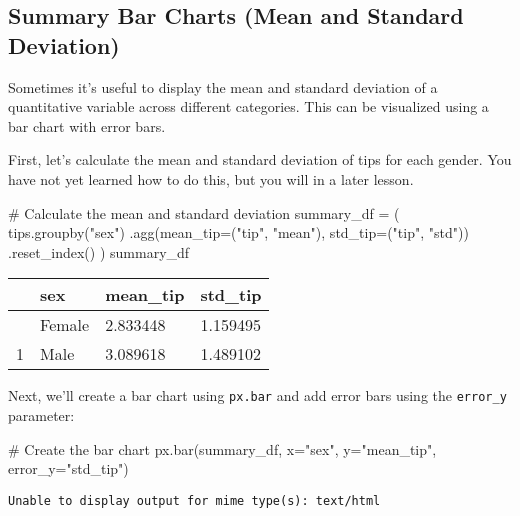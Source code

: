\documentclass[
  letterpaper,
  DIV=11,
  numbers=noendperiod]{scrreprt}
\newenvironment{Shaded}{\begin{snugshade}}{\end{snugshade}}
\newcommand{\CommentTok}[1]{\textcolor[rgb]{0.37,0.37,0.37}{#1}}
\newcommand{\NormalTok}[1]{\textcolor[rgb]{0.00,0.23,0.31}{#1}}
\newcommand{\OperatorTok}[1]{\textcolor[rgb]{0.37,0.37,0.37}{#1}}
\newcommand{\StringTok}[1]{\textcolor[rgb]{0.13,0.47,0.30}{#1}}
\begin{document}
\subsection{Summary Bar Charts (Mean and Standard
Deviation)}\label{summary-bar-charts-mean-and-standard-deviation}

Sometimes it's useful to display the mean and standard deviation of a
quantitative variable across different categories. This can be
visualized using a bar chart with error bars.

First, let's calculate the mean and standard deviation of tips for each
gender. You have not yet learned how to do this, but you will in a later
lesson.

\begin{Shaded}
\begin{Highlighting}[]
\CommentTok{\# Calculate the mean and standard deviation}
\NormalTok{summary\_df }\OperatorTok{=}\NormalTok{ (}
\NormalTok{    tips.groupby(}\StringTok{"sex"}\NormalTok{)}
\NormalTok{    .agg(mean\_tip}\OperatorTok{=}\NormalTok{(}\StringTok{"tip"}\NormalTok{, }\StringTok{"mean"}\NormalTok{), std\_tip}\OperatorTok{=}\NormalTok{(}\StringTok{"tip"}\NormalTok{, }\StringTok{"std"}\NormalTok{))}
\NormalTok{    .reset\_index()}
\NormalTok{)}
\NormalTok{summary\_df}
\end{Highlighting}
\end{Shaded}

\begin{longtable}[]{@{}llll@{}}
\toprule\noalign{}
& sex & mean\_tip & std\_tip \\
\midrule\noalign{}
\endhead
\bottomrule\noalign{}
\endlastfoot
0 & Female & 2.833448 & 1.159495 \\
1 & Male & 3.089618 & 1.489102 \\
\end{longtable}

Next, we'll create a bar chart using \texttt{px.bar} and add error bars
using the \texttt{error\_y} parameter:

\begin{Shaded}
\begin{Highlighting}[]
\CommentTok{\# Create the bar chart}
\NormalTok{px.bar(summary\_df, x}\OperatorTok{=}\StringTok{"sex"}\NormalTok{, y}\OperatorTok{=}\StringTok{"mean\_tip"}\NormalTok{, error\_y}\OperatorTok{=}\StringTok{"std\_tip"}\NormalTok{)}
\end{Highlighting}
\end{Shaded}

\begin{verbatim}
Unable to display output for mime type(s): text/html
\end{verbatim}
\end{document}
